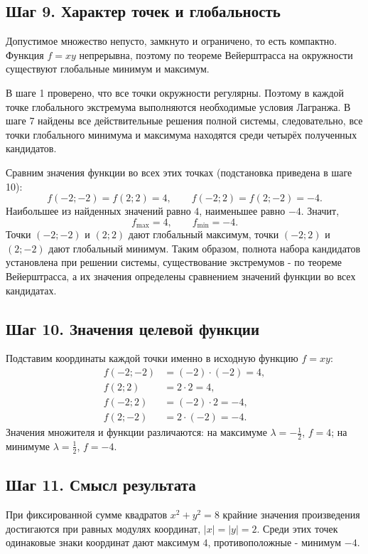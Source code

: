 \documentclass[a4paper,12pt]{article}
\begin{document}
\subsection*{Шаг 9. Характер точек и глобальность}

Допустимое множество непусто, замкнуто и ограничено, то есть компактно. Функция $f=xy$ непрерывна, поэтому по теореме Вейерштрасса на окружности существуют глобальные минимум и максимум.

В шаге 1 проверено, что все точки окружности регулярны. Поэтому в каждой точке глобального экстремума выполняются необходимые условия Лагранжа. В шаге 7 найдены все действительные решения полной системы, следовательно, все точки глобального минимума и максимума находятся среди четырёх полученных кандидатов.

Сравним значения функции во всех этих точках (подстановка приведена в шаге 10):
\[
f(-2;-2)=f(2;2)=4,\qquad f(-2;2)=f(2;-2)=-4.
\]
Наибольшее из найденных значений равно $4$, наименьшее равно $-4$. Значит,
\[
f_{\max}=4,\qquad f_{\min}=-4.
\]
Точки $(-2;-2)$ и $(2;2)$ дают глобальный максимум, точки $(-2;2)$ и $(2;-2)$ дают глобальный минимум. Таким образом, полнота набора кандидатов установлена при решении системы, существование экстремумов - по теореме Вейерштрасса, а их значения определены сравнением значений функции во всех кандидатах.

\subsection*{Шаг 10. Значения целевой функции}

Подставим координаты каждой точки именно в исходную функцию $f=xy$:
\begin{align*}
f(-2;-2)&=(-2)\cdot(-2)=4,\\
f(2;2)&=2\cdot2=4,\\
f(-2;2)&=(-2)\cdot2=-4,\\
f(2;-2)&=2\cdot(-2)=-4.
\end{align*}
Значения множителя и функции различаются: на максимуме $\lambda=-\frac12$, $f=4$; на минимуме $\lambda=\frac12$, $f=-4$.

\subsection*{Шаг 11. Смысл результата}

При фиксированной сумме квадратов $x^2+y^2=8$ крайние значения произведения достигаются при равных модулях координат, $|x|=|y|=2$. Среди этих точек одинаковые знаки координат дают максимум $4$, противоположные - минимум $-4$.
\end{document}
